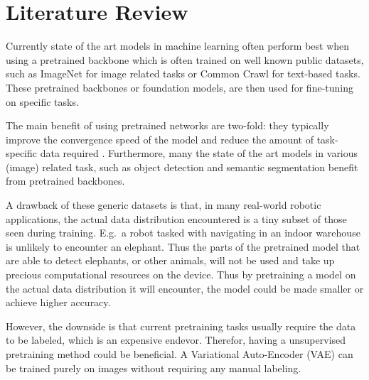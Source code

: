 \chapter{Literature Review}
Currently state of the art models in machine learning often perform best when using a pretrained backbone which is often trained on well known public datasets, such as ImageNet \cite{deng2009imagenet} for image related tasks or Common Crawl \cite{commoncrawl} for text-based tasks. These pretrained backbones or foundation models, are then used for fine-tuning on specific tasks.

The main benefit of using pretrained networks are two-fold: they typically improve the convergence speed of the model and reduce the amount of task-specific data required \cite{donahue2014decaf,zeiler2014visualizing}. Furthermore, many the state of the art models in various (image) related task, such as object detection\cite{liu2016ssd,redmon2016you} and semantic segmentation \cite{orsic2019defense,girshick2014rich} benefit from pretrained backbones.

A drawback of these generic datasets is that, in many real-world robotic applications, the actual data distribution encountered is a tiny subset of those seen during training. E.g.\ a robot tasked with navigating in an indoor warehouse is unlikely to encounter an elephant. Thus the parts of the pretrained model that are able to detect elephants, or other animals, will not be used and take up precious computational resources on the device. Thus by pretraining a model on the actual data distribution it will encounter, the model could be made smaller or achieve higher accuracy.

However, the downside is that current pretraining tasks usually require the data to be labeled, which is an expensive endevor. Therefor, having a unsupervised pretraining method could be beneficial. A Variational Auto-Encoder (VAE) can be trained purely on images without requiring any manual labeling.

